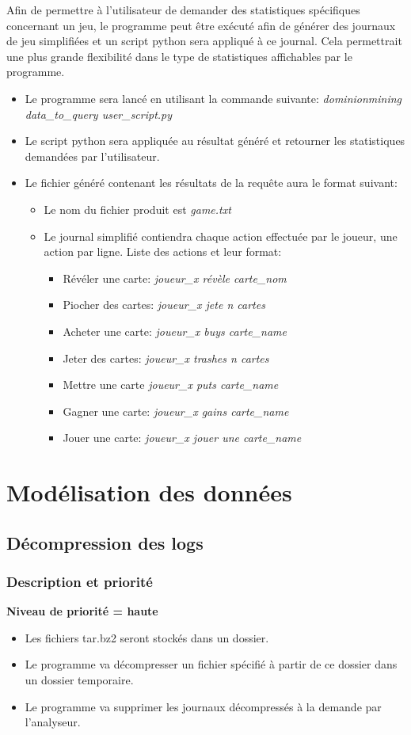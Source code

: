 \documentclass{scrreprt}
\begin{document}
Afin de permettre à l'utilisateur de demander des statistiques spécifiques concernant un jeu, le programme peut être exécuté afin de générer des journaux de jeu simplifiées et un script python sera appliqué à ce journal. Cela permettrait une plus grande flexibilité dans le type de statistiques affichables par le programme.
\begin{itemize}
\item Le programme sera lancé en utilisant la commande suivante: \textit{dominionmining data\_to\_query user\_script.py}
 \item Le script python sera appliquée au résultat généré et retourner les statistiques demandées par l'utilisateur.
\item Le fichier généré contenant les résultats de la requête aura le format suivant:
\begin{itemize}
\item Le nom du fichier produit est \textit{game.txt}
\item Le journal simplifié contiendra chaque action effectuée par le joueur, une action par ligne. Liste des actions et leur format:
\begin{itemize}
\item Révéler une carte: \textit{joueur\_x révèle carte\_nom}
\item Piocher des cartes: \textit{joueur\_x jete n cartes}
\item Acheter une carte: \textit{joueur\_x buys carte\_name}
\item Jeter des cartes: \textit{joueur\_x trashes n cartes}
\item Mettre une carte \textit{joueur\_x puts carte\_name}
\item Gagner une carte: \textit{joueur\_x gains carte\_name}
\item Jouer une carte: \textit{joueur\_x jouer une carte\_name}

\end{itemize}
\end{itemize}
\end{itemize}

\section{Modélisation des données}

\subsection{Décompression des logs}
\subsubsection{Description et priorité}
\textbf{Niveau de priorité = haute}\\
\begin{itemize}
  \item Les fichiers tar.bz2 seront stockés dans un dossier.
  \item Le programme va  décompresser un fichier spécifié à partir de ce dossier dans un dossier temporaire.
  \item Le programme va  supprimer les journaux décompressés  à la demande par l'analyseur.
\end{itemize}
\end{document}
